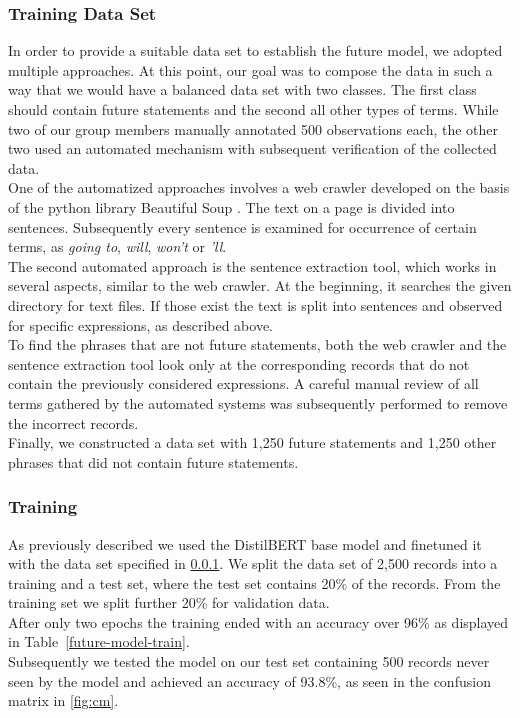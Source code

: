 \subsubsection{Training Data Set}
\label{training}
In order to provide a suitable data set to establish the future model, we adopted multiple approaches.
At this point, our goal was to compose the data in such a way that we would have a balanced data set with two classes.
The first class should contain future statements and the second all other types of terms.
While two of our group members manually annotated 500 observations each, the other two used an automated mechanism with subsequent verification of the collected data.
\\
One of the automatized approaches involves a web crawler developed on the basis of the python library Beautiful Soup \citep{Richardson2022}.
The text on a page is divided into sentences.
Subsequently every sentence is examined for occurrence of certain terms, as \emph{going to}, \emph{will}, \emph{won't} or \emph{'ll}.
\\
The second automated approach is the sentence extraction tool, which works in several aspects, similar to the web crawler.
At the beginning, it searches the given directory for text files.
If those exist the text is split into sentences and observed for specific expressions, as described above.
\\
To find the phrases that are not future statements, both the web crawler and the sentence extraction tool look only at the corresponding records that do not contain the previously considered expressions.
A careful manual review of all terms gathered by the automated systems was subsequently performed to remove the incorrect records.
\\
Finally, we constructed a data set with 1,250 future statements and 1,250 other phrases that did not contain future statements.

\subsubsection{Training}
As previously described we used the DistilBERT base model and finetuned it with the data set specified in \ref{training}.
We split the data set of 2,500 records into a training and a test set, where the test set contains 20\% of the records.
From the training set we split further 20\% for validation data.
\\
After only two epochs the training ended with an accuracy over 96\% as displayed in Table~\ref{future-model-train}.
\\
Subsequently we tested the model on our test set containing 500 records never seen by the model and achieved an accuracy of 93.8\%, as seen in the confusion matrix in \autoref{fig:cm}.


